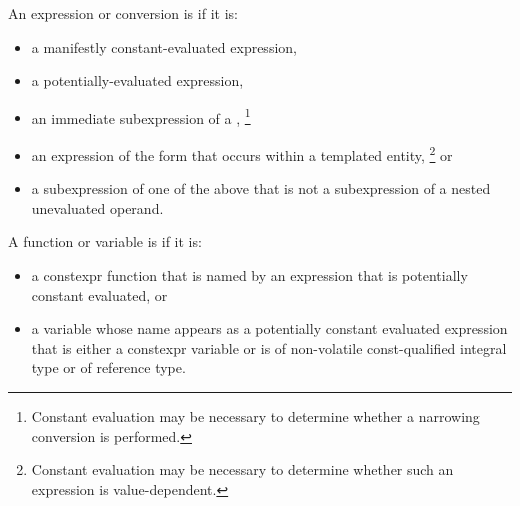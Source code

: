 \pnum
{}%
An expression or conversion is 
if it is:
\begin{itemize}
\item
a manifestly constant-evaluated expression,

\item
a potentially-evaluated expression,

\item
an immediate subexpression of a ,%
\footnote{Constant evaluation may be necessary to determine whether a narrowing conversion is performed.}

\item
an expression of the form \tcode{\&} 
that occurs within a templated entity,%
\footnote{Constant evaluation may be necessary to determine whether such an expression is value-dependent.}
or

\item
a subexpression of one of the above
that is not a subexpression of a nested unevaluated operand.
\end{itemize}

%
%
A function or variable is
if it is:
\begin{itemize}
\item
a constexpr function that is named by an expression
that is potentially constant evaluated, or

\item
a variable whose name appears as a potentially constant evaluated expression
that is either a constexpr variable or
is of non-volatile const-qualified integral type or of reference type.
\end{itemize}

